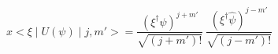 \begin{equation}
x
<\xi\mid U(\psi)\mid j,m'> =  \frac{(\xi^\dag \psi)^{j+m'}}{\sqrt{(j+m')!}}~\frac{(\xi^\dag \hat{\psi})^{j-m'}}{\sqrt{(j-m')!}}  
\end{equation}

